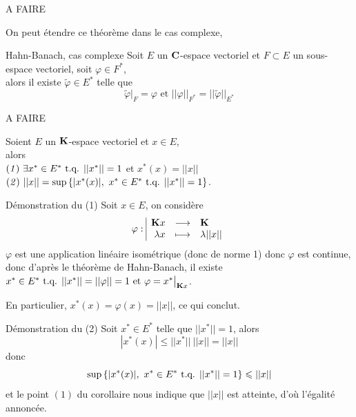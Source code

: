 \documentclass[a4paper,11pt, twoside]{article}
\begin{document}
\begin{Proof}
  A FAIRE
\end{Proof}


On peut étendre ce théorème dans le cas complexe, 


\begin{thC}{Hahn-Banach, cas complexe}
  Soit $E$ un $\mathbf C$-espace vectoriel et $F\subset E$ un sous-espace vectoriel, soit $\varphi\in F^*$,\\

  alors il existe $\tilde\varphi\in E^*$ telle que 
  $$\tilde\varphi\big|_F=\varphi\text{ et }||\varphi||_{F^*}=||\tilde\varphi||_{E^*}$$
\end{thC}
  

\begin{Proof}
  A FAIRE
\end{Proof}


\begin{corollaire}
  Soient $E$ un $\mathbf K$-espace vectoriel et $x\in E$,\\

  alors\\
  $(\mathit 1)\ \exists x^*\in E^*\text{ t.q. } ||x^*||=1$ et $x^*(x)=||x||$\\[1em]
  $(\mathit 2)\ ||x||=\mathrm{sup}\left\{|x^*(x)|,\ x^*\in E^*\tq ||x^*||=1\right\}$.
\end{corollaire}


\begin{ProofC}{Démonstration du (1)}
  Soit $x\in  E$, on considère 
  $$\varphi:\begin{array}{|rcl}
    \mathbf K x&\longrightarrow&\mathbf K\\
    \lambda x&\longmapsto&\lambda||x||
  \end{array}$$
  $\varphi$ est une application linéaire isométrique (donc de norme 1) donc $\varphi$ est continue, donc d'après le théorème de Hahn-Banach, il existe $x^*\in E^*\text{ t.q. } ||x^*||=||\varphi||=1\text{ et }\varphi=x^*\big|_{\mathbf K x}$.

  En particulier, $x^*(x)=\varphi(x)=||x||$, ce qui conclut.
\end{ProofC}


\begin{ProofC}{Démonstration du (2)}
  Soit $x^*\in E^*$ telle que $||x^*||=1$, alors
  $$|x^*(x)|\leqslant ||x^*||\ ||x||=||x||$$
  donc 
  $$\mathrm{sup}\left\{|x^*(x)|,\ x^*\in E^*\text{ t.q. } ||x^*||=1\right\}\leqslant ||x||$$
  et le point $(1)$ du corollaire nous indique que $||x||$ est atteinte, d'où l'égalité annoncée.
\end{ProofC}
\end{document}

